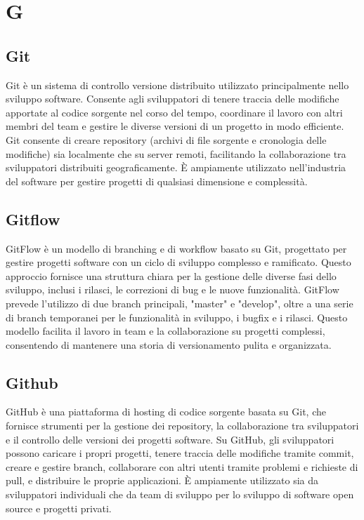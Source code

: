 \section{G} 
\subsection{Git} 
Git è un sistema di controllo versione distribuito utilizzato principalmente nello sviluppo software. Consente agli sviluppatori di tenere traccia delle modifiche apportate al codice sorgente nel corso del tempo, coordinare il lavoro con altri membri del team e gestire le diverse versioni di un progetto in modo efficiente. Git consente di creare repository (archivi di file sorgente e cronologia delle modifiche) sia localmente che su server remoti, facilitando la collaborazione tra sviluppatori distribuiti geograficamente. È ampiamente utilizzato nell'industria del software per gestire progetti di qualsiasi dimensione e complessità.
\subsection{Gitflow} 
GitFlow è un modello di branching e di workflow basato su Git, progettato per gestire progetti software con un ciclo di sviluppo complesso e ramificato. Questo approccio fornisce una struttura chiara per la gestione delle diverse fasi dello sviluppo, inclusi i rilasci, le correzioni di bug e le nuove funzionalità. GitFlow prevede l'utilizzo di due branch principali, "master" e "develop", oltre a una serie di branch temporanei per le funzionalità in sviluppo, i bugfix e i rilasci. Questo modello facilita il lavoro in team e la collaborazione su progetti complessi, consentendo di mantenere una storia di versionamento pulita e organizzata.
\subsection{Github} 
GitHub è una piattaforma di hosting di codice sorgente basata su Git, che fornisce strumenti per la gestione dei repository, la collaborazione tra sviluppatori e il controllo delle versioni dei progetti software. Su GitHub, gli sviluppatori possono caricare i propri progetti, tenere traccia delle modifiche tramite commit, creare e gestire branch, collaborare con altri utenti tramite problemi e richieste di pull, e distribuire le proprie applicazioni. È ampiamente utilizzato sia da sviluppatori individuali che da team di sviluppo per lo sviluppo di software open source e progetti privati.
